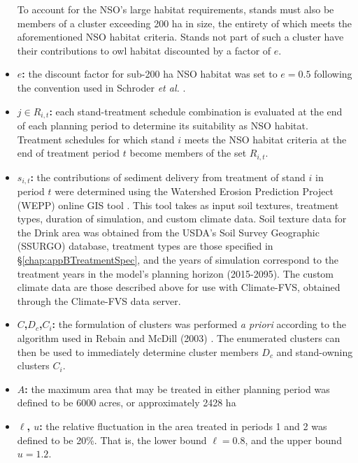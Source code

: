 \begin{itemize}
To account for the NSO's large habitat requirements, stands must also be members of a cluster exceeding 200 ha in size, the entirety of which meets the aforementioned NSO habitat criteria. Stands not part of such a cluster have their contributions to owl habitat discounted by a factor of $e$.
\item \textbf{$e$:} the discount factor for sub-200 ha NSO habitat was set to $e = 0.5$ following the convention used in Schroder \textit{et al.} \cite{schroder2016multi}.
\item \textbf{$j \in R_{i,t}$:} each stand-treatment schedule combination is evaluated at the end of each planning period to determine its suitability as NSO habitat. Treatment schedules for which stand $i$ meets the NSO habitat criteria at the end of treatment period $t$ become members of the set $R_{i,t}$. 
\item \textbf{$s_{i,t}$:} the contributions of sediment delivery from treatment of stand $i$ in period $t$ were determined using the Watershed Erosion Prediction Project (WEPP) online GIS tool \cite{frankenberger2011development}. This tool takes as input soil textures, treatment types, duration of simulation, and custom climate data. Soil texture data for the Drink area was obtained from the USDA's Soil Survey Geographic (SSURGO) database, treatment types are those specified in \S \ref{chap:appBTreatmentSpec}, and the years of simulation correspond to the treatment years in the model's planning horizon (2015-2095). The custom climate data are those described above for use with Climate-FVS, obtained through the Climate-FVS data server.
\item \textbf{$C$,$D_c$,$C_i$:} the formulation of clusters was performed \textit{a priori} according to the algorithm used in Rebain and McDill (2003) \cite{rebain2003mixed}. The enumerated clusters can then be used to immediately determine cluster members $D_c$ and stand-owning clusters $C_i$.
\item \textbf{$A$:} the maximum area that may be treated in either planning period was defined to be 6000 acres, or approximately 2428 ha
\item \textbf{$\ell$, $u$:} the relative fluctuation in the area treated in periods 1 and 2 was defined to be 20\%. That is, the lower bound $\ell = 0.8$, and the upper bound $u = 1.2$.
\end{itemize}
